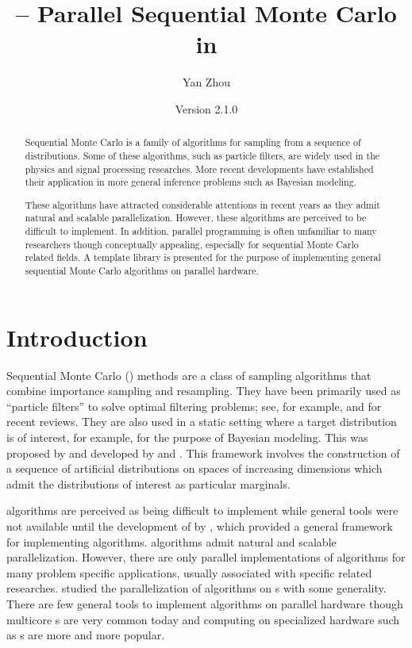 \documentclass[11pt,bib,mint,hyper,altcolor]{marticle}
\begin{document}
\title{\protect\vsmc{} -- Parallel Sequential Monte Carlo in \protect\cpp}
\author{Yan Zhou}
\date{Version 2.1.0}

\maketitle
\tableofcontents

\begin{abstract}
  Sequential Monte Carlo is a family of algorithms for sampling from a sequence
  of distributions. Some of these algorithms, such as particle filters, are
  widely used in the physics and signal processing researches. More recent
  developments have established their application in more general inference
  problems such as Bayesian modeling.

  These algorithms have attracted considerable attentions in recent years as
  they admit natural and scalable parallelization. However, these algorithms
  are perceived to be difficult to implement. In addition, parallel programming
  is often unfamiliar to many researchers though conceptually appealing,
  especially for sequential Monte Carlo related fields. A \cpp template library
  is presented for the purpose of implementing general sequential Monte Carlo
  algorithms on parallel hardware.
\end{abstract}

\section{Introduction}
\label{sec:Introduction}

Sequential Monte Carlo (\smc) methods are a class of sampling algorithms that
combine importance sampling and resampling. They have been primarily used as
``particle filters'' to solve optimal filtering problems; see, for example,
\textcite{Cappe:2007hz} and \textcite{Doucet:2011us} for recent reviews. They
are also used in a static setting where a target distribution is of interest,
for example, for the purpose of Bayesian modeling. This was proposed by
\textcite{DelMoral:2006hc} and developed by \textcite{Peters:2005wh} and
\textcite{DelMoral:2006wv}. This framework involves the construction of a
sequence of artificial distributions on spaces of increasing dimensions which
admit the distributions of interest as particular marginals.

\smc algorithms are perceived as being difficult to implement while general
tools were not available until the development of \smctc by
\textcite{Johansen:2009wd}, which provided a general framework for implementing
\smc algorithms. \smc algorithms admit natural and scalable parallelization.
However, there are only parallel implementations of \smc algorithms for many
problem specific applications, usually associated with specific \smc related
researches. \textcite{Lee:2010fm} studied the parallelization of \smc
algorithms on \gpu{}s with some generality. There are few general tools to
implement \smc algorithms on parallel hardware though multicore \cpu{}s are
very common today and computing on specialized hardware such as \gpu{}s are
more and more popular.
\end{document}
